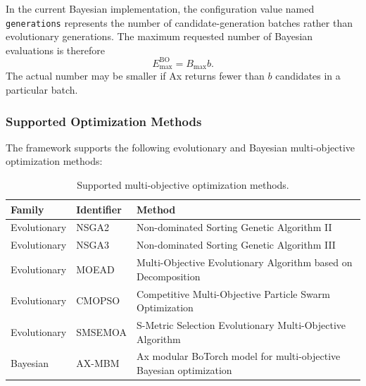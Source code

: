 In the current Bayesian implementation, the configuration value named \texttt{generations}
represents the number of candidate-generation batches rather than evolutionary generations. The
maximum requested number of Bayesian evaluations is therefore
\begin{equation}
    E_{\max}^{\mathrm{BO}} = B_{\max}b.
\end{equation}
The actual number may be smaller if Ax returns fewer than $b$ candidates in a particular batch.

\subsubsection{Supported Optimization Methods}

The framework supports the following evolutionary and Bayesian multi-objective optimization methods:

\begin{table}[H]
\centering
\caption{Supported multi-objective optimization methods.}
\label{tab:algorithms_sc}
\begin{tabularx}{\textwidth}{@{}l l >{\raggedright\arraybackslash}X@{}}
\toprule
\textbf{Family} & \textbf{Identifier} & \textbf{Method} \\
\midrule
Evolutionary & NSGA2 & Non-dominated Sorting Genetic Algorithm II \\
Evolutionary & NSGA3 & Non-dominated Sorting Genetic Algorithm III \\
Evolutionary & MOEAD & Multi-Objective Evolutionary Algorithm based on Decomposition \\
Evolutionary & CMOPSO & Competitive Multi-Objective Particle Swarm Optimization \\
Evolutionary & SMSEMOA & S-Metric Selection Evolutionary Multi-Objective Algorithm \\
Bayesian & AX-MBM & Ax modular BoTorch model for multi-objective Bayesian optimization \\
\bottomrule
\end{tabularx}
\end{table}

